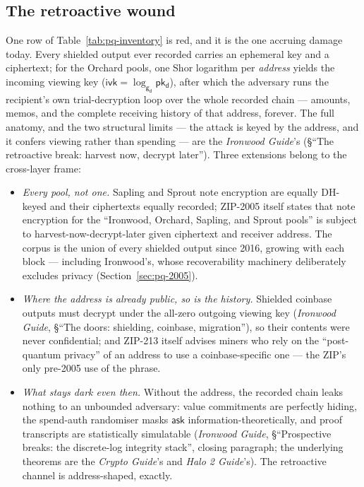 \documentclass[11pt,a4paper]{article}
\theoremstyle{definition}
\newcommand{\ask}{\ensuremath{\mathsf{ask}}}
\newcommand{\ivk}{\ensuremath{\mathsf{ivk}}}
\newcommand{\pkd}{\ensuremath{\mathsf{pk_d}}}
\newcommand{\gd}{\ensuremath{\mathsf{g_d}}}
\begin{document}
\subsection{The retroactive wound}\label{sec:pq-retro}

One row of Table~\ref{tab:pq-inventory} is red, and it is the one
accruing damage today. Every shielded output ever recorded carries an
ephemeral key and a ciphertext; for the Orchard pools, one Shor
logarithm per \emph{address} yields the incoming viewing key
($\ivk = \log_{\gd} \pkd$), after which the adversary runs the
recipient's own trial-decryption loop over the whole recorded chain ---
amounts, memos, and the complete receiving history of that address,
forever. The full anatomy, and the two structural limits --- the
attack is keyed by the address, and it confers viewing rather than
spending --- are the \emph{Ironwood Guide}'s (\S``The retroactive break:
harvest now, decrypt later''). Three
extensions belong to the cross-layer frame:

\begin{itemize}[leftmargin=*]
\item \emph{Every pool, not one.} Sapling and Sprout note encryption
are equally DH-keyed and their ciphertexts equally recorded; ZIP-2005
itself states that note encryption for the ``Ironwood, Orchard,
Sapling, and Sprout pools'' is subject to harvest-now-decrypt-later
given ciphertext and receiver address. The corpus is the union of every
shielded output since 2016, growing with each block --- including
Ironwood's, whose recoverability machinery deliberately excludes
privacy (Section~\ref{sec:pq-2005}).
\item \emph{Where the address is already public, so is the history.}
Shielded coinbase outputs must decrypt under the all-zero outgoing
viewing key (\emph{Ironwood Guide}, \S``The doors: shielding, coinbase, migration''),
so their contents were never confidential; and ZIP-213 itself advises
miners who rely on the ``post-quantum privacy'' of an address to use a
coinbase-specific one --- the ZIP's only pre-2005 use of the phrase.
\item \emph{What stays dark even then.} Without the address, the
recorded chain leaks nothing to an unbounded adversary: value
commitments are perfectly hiding, the spend-auth randomiser masks
$\ask$ information-theoretically, and proof transcripts are
statistically simulatable (\emph{Ironwood Guide},
\S``Prospective breaks: the discrete-log integrity stack'',
closing paragraph; the underlying theorems are the \emph{Crypto
Guide}'s and \emph{Halo 2 Guide}'s). The retroactive channel is
address-shaped, exactly.
\end{itemize}
\end{document}
